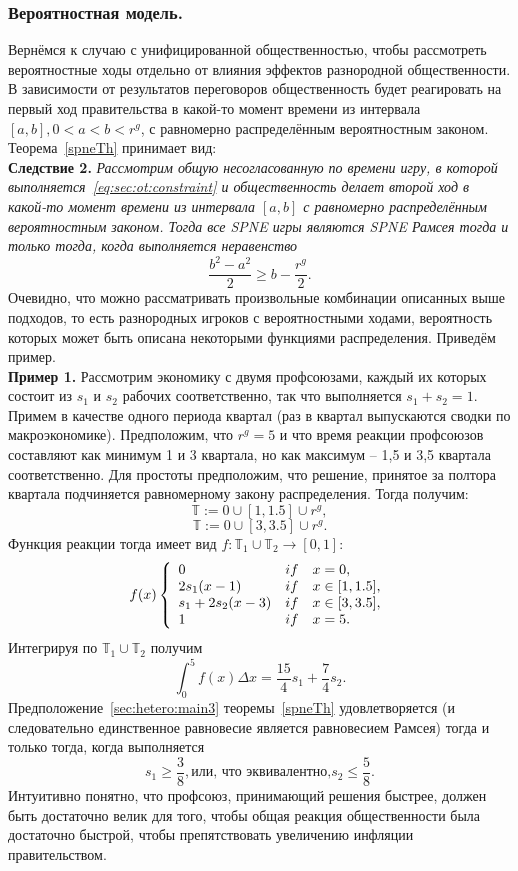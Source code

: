 \subsubsection{Вероятностная модель.}
Вернёмся к случаю с унифицированной общественностью, чтобы рассмотреть вероятностные ходы отдельно от влияния эффектов разнородной общественности. В зависимости от результатов переговоров общественность будет реагировать на первый ход правительства в какой-то момент времени из интервала $[a,b], 0< a < b < r^g$, с равномерно распределённым вероятностным законом. Теорема~\ref{spneTh} принимает вид:\\
\textbf{Следствие 2.} \textit{Рассмотрим общую несогласованную по времени игру, в которой выполняется~\eqref{eq:sec:ot:constraint} и общественность делает второй ход в какой-то момент времени из интервала $[a,b]$ с равномерно распределённым вероятностным законом. Тогда все SPNE игры являются SPNE Рамсея тогда и только тогда, когда выполняется неравенство
	\begin{equation}
	\label{sec:hetero:main5}
	\frac{b^2 - a^2}{2} \geq b - \frac{r^g}{2} .
	\end{equation}
}
Очевидно, что можно рассматривать произвольные комбинации описанных выше подходов, то есть разнородных игроков с вероятностными ходами, вероятность которых может быть описана некоторыми функциями распределения. Приведём пример.\\
\textbf{Пример 1.} Рассмотрим экономику с двумя профсоюзами, каждый их которых состоит из $s_1$ и $s_2$ рабочих соответственно, так что выполняется $s_1 + s_2 = 1$. Примем в качестве одного периода квартал (раз в квартал выпускаются сводки по макроэкономике). Предположим, что $r^g = 5$ и что время реакции профсоюзов составляют как минимум  1 и 3 квартала, но как максимум -- 1,5 и 3,5 квартала соответственно. Для простоты предположим, что решение, принятое за полтора квартала подчиняется равномерному закону распределения. Тогда получим:
$$ \mathbb{T} :={0} \cup [1, 1.5] \cup {r^g} ,$$
$$ \mathbb{T} :={0} \cup [3, 3.5] \cup {r^g} .$$
Функция реакции тогда имеет вид $f : \mathbb{T}_1\cup\mathbb{T}_2\to[0,1]$:
$$ f(x)\left\{  
\begin{array}{l c l}
0 & if & x = 0,\\
2s_1(x - 1) & if & x \in [1,1.5],\\
s_1 + 2s_2(x - 3) & if & x \in [3,3.5],\\
1 & if & x = 5.
\end{array} 
\right.$$
Интегрируя по $\mathbb{T}_1\cup\mathbb{T}_2$ получим
$$ \int_0^5 f(x) \Delta x = \frac{15}{4}s_1 + \frac{7}{4}s_2. $$
Предположение~\eqref{sec:hetero:main3} теоремы~\ref{spneTh} удовлетворяется (и следовательно единственное равновесие является равновесием Рамсея) тогда и только тогда, когда выполняется
$$ s_1 \geq \frac{3}{8}, \text{или, что эквивалентно,} s_2 \leq \frac{5}{8}. $$
Интуитивно понятно, что профсоюз, принимающий решения быстрее, должен быть достаточно велик для того, чтобы общая реакция общественности была достаточно быстрой, чтобы препятствовать увеличению инфляции правительством.

